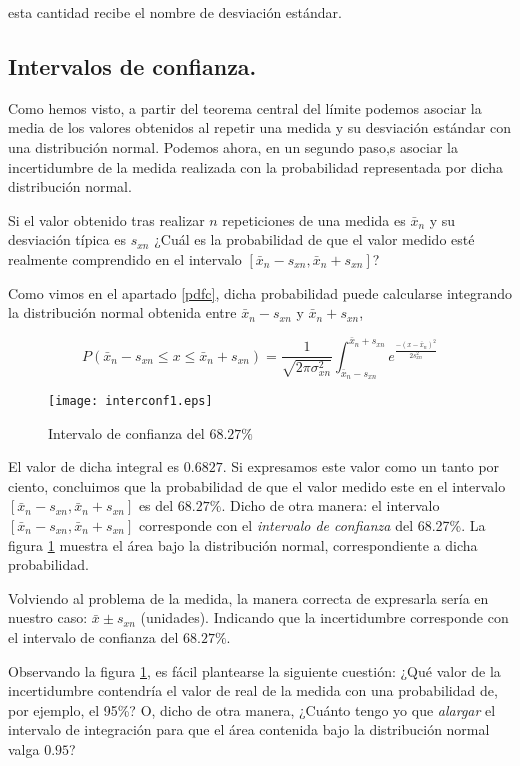esta cantidad recibe el nombre de desviación estándar.

\subsection{Intervalos de confianza.}
Como hemos visto, a partir del teorema central del límite podemos asociar la media de los valores obtenidos al repetir una medida y su desviación estándar con una distribución normal. Podemos ahora, en un segundo paso,s asociar la incertidumbre de la medida realizada con la probabilidad representada por dicha distribución normal.

Si el valor obtenido tras realizar $n$ repeticiones de una medida es $\bar{x}_n$ y su desviación típica es $s_{xn}$ ¿Cuál es la probabilidad de que el valor medido esté realmente comprendido en el intervalo $[\bar{x}_n-s_{xn}, \bar{x}_n+s_{xn}]$? 

Como vimos en el apartado \ref{pdfc}, dicha probabilidad puede calcularse integrando la distribución normal obtenida entre $\bar{x}_n-s_{xn}$ y $\bar{x}_n+s_{xn}$,

\begin{equation*}
P(\bar{x}_n - s_{xn} \leqslant x \leqslant \bar{x}_n
+ s_{xn}) = \frac{1}{\sqrt{2\pi\sigma^2_{xn}}}\int_{\bar{x}_n-s_{xn}}^{\bar{x}_n+s_{xn}}e^{\frac{-(x-\bar{x}_n)^2}{2s_{xn}^2}}
\end{equation*}
\begin{figure}[h]
\centering
\texttt{[image: interconf1.eps]}
\caption{Intervalo de confianza del $68.27\%$ }
\label{fig:ic1}
\end{figure}

El valor de dicha integral es $0.6827$. Si expresamos este valor como un tanto por ciento, concluimos que la probabilidad de que el valor medido este en el intervalo $[\bar{x}_n-s_{xn}, \bar{x}_n+s_{xn}]$ es del $68.27\%$. Dicho de otra manera: el intervalo $[\bar{x}_n-s_{xn}, \bar{x}_n+s_{xn}]$ corresponde con el \emph{intervalo de confianza} del 68.27\%. La figura \ref{fig:ic1} muestra el área bajo la distribución normal, correspondiente a dicha probabilidad.

Volviendo al problema de la medida, la manera correcta de expresarla sería en nuestro caso:  $\bar{x}\pm s_{xn}$ (unidades). Indicando que la incertidumbre corresponde con el intervalo de confianza del $68.27\%$.


Observando la figura \ref{fig:ic1}, es fácil plantearse la siguiente cuestión: ¿Qué valor de la incertidumbre contendría el valor de real de la medida con una probabilidad de, por ejemplo, el 95\%? O, dicho de otra manera, ¿Cuánto tengo yo que \emph{alargar} el intervalo de integración para que el área contenida bajo la distribución normal valga $0.95$?

